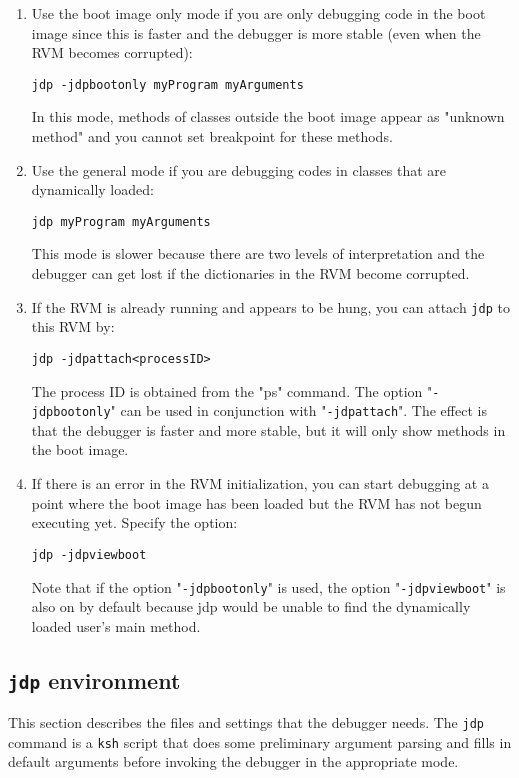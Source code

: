 \begin{enumerate}
\item Use the boot image only mode if you are only debugging code
in the boot image since this is faster and the debugger is more stable
(even when the RVM becomes corrupted):
\begin{verbatim}
jdp -jdpbootonly myProgram myArguments
\end{verbatim}
   In this mode, methods of classes outside the boot image appear
as "unknown method" and you cannot set breakpoint for these methods.


\item Use the general mode if you are debugging codes in classes that are 
dynamically loaded:
\begin{verbatim}
jdp myProgram myArguments
\end{verbatim}
   This mode is slower because there are two levels of interpretation
and the debugger can get lost if the dictionaries in the RVM become 
corrupted.


\item If the RVM is already running and appears to be hung, you can attach 
{\tt jdp} to this RVM by:
\begin{verbatim}
jdp -jdpattach<processID>
\end{verbatim}
   The process ID is obtained from the "ps" command.  
   The option "{\tt -jdpbootonly}" can be used in conjunction with 
   "{\tt -jdpattach}".  The effect is that the debugger is faster and more
   stable, but it will only show methods in the boot image.

\item If there is an error in the RVM initialization, you can start debugging
 at a point where the boot image has been loaded but the RVM has not begun
 executing yet. Specify the option:
\begin{verbatim}
jdp -jdpviewboot
\end{verbatim}
  Note that if the option "{\tt -jdpbootonly}" is used, the option 
  "{\tt -jdpviewboot}" is also on by default because jdp would be unable
  to find the dynamically loaded user's main method.


\end{enumerate}


\subsection{{\tt jdp} environment}

   This section describes the files and settings that the debugger
needs.  The {\tt jdp} command is a {\tt ksh} script that does some preliminary
argument parsing and fills in default arguments before invoking the
debugger in the appropriate mode.

